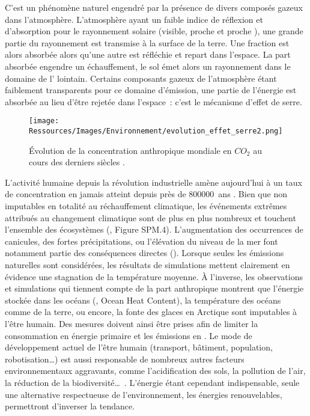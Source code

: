 \begin{Def}\label{def:effet_serre}
C’est un phénomène naturel engendré par la présence de divers composés
gazeux dans l’atmosphère. L’atmosphère ayant un faible indice de réflexion et d’absorption
pour le rayonnement solaire (visible, proche  et proche ), une grande
partie du rayonnement est transmise à la surface de la terre. Une fraction est alors
absorbée alors qu’une autre est réfléchie et repart dans l’espace. La part absorbée
engendre un échauffement, le sol émet alors un rayonnement dans le domaine de l’
lointain. Certains composants gazeux de l’atmosphère étant faiblement transparents pour ce
domaine d’émission, une partie de l’énergie est absorbée au lieu d’être rejetée dans
l’espace~: c’est le mécanisme d’effet de serre.
\end{Def}

\begin{figure}
    \centering
    \texttt{[image: Ressources/Images/Environnement/evolution\_effet\_serre2.png]}
    \caption[Évolution de la concentration anthropique mondiale en $CO_{2}$]
            {Évolution de la concentration anthropique mondiale en $CO_{2}$ au cours des derniers siècles
             \parencite{IPCC2014}.}
    \label{fig:evolution_effet_serre}
\end{figure}

L’activité humaine depuis la révolution industrielle amène aujourd’hui à un taux de
concentration en  jamais atteint depuis près de \SI{800000}{ans}
\parencite{IPCC2014}. Bien que non imputables en totalité au réchauffement climatique, les
événements extrêmes attribués au changement climatique sont de plus en plus nombreux et
touchent l’ensemble des écosystèmes (\cite{IPCC2014}, Figure SPM.4). L’augmentation des
occurrences de canicules, des fortes précipitations, ou l’élévation du niveau de la mer
font notamment partie des conséquences directes (). Lorsque
seules les émissions naturelles sont considérées, les résultats de simulations mettent
clairement en évidence une stagnation de la température moyenne. À l’inverse, les
observations et simulations qui tiennent compte de la part anthropique montrent que
l’énergie stockée dans les océans (, Ocean Heat Content), la température des
océans comme de la terre, ou encore, la fonte des glaces en Arctique sont imputables à
l’être humain. Des mesures doivent ainsi être prises afin de limiter la consommation en
énergie primaire et les émissions en . Le mode de développement actuel de l’être
humain (transport, bâtiment, population, robotisation\dots) est aussi responsable de
nombreux autres facteurs environnementaux aggravants, comme l’acidification des sols, la
pollution de l’air, la réduction de la biodiversité\dots\ \parencite{Biermann2016341}.
L’énergie étant cependant indispensable, seule une alternative respectueuse de
l’environnement, les énergies renouvelables, permettront d’inverser la tendance.

